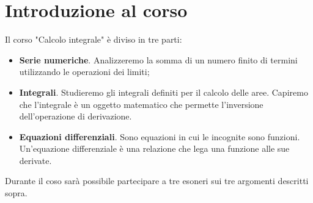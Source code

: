 \chapter*{Introduzione al corso}

Il corso "Calcolo integrale" è diviso in tre parti:
\begin{itemize}
    \item \textbf{Serie numeriche}. Analizzeremo la somma di un numero finito di termini utilizzando le operazioni dei limiti;
    \item \textbf{Integrali}. Studieremo gli integrali definiti per il calcolo delle aree. Capiremo che l'integrale è un oggetto matematico che permette l'inversione dell'operazione di derivazione.
    \item \textbf{Equazioni differenziali}. Sono equazioni in cui le incognite sono funzioni. Un'equazione differenziale è una relazione che lega una funzione alle sue derivate.
\end{itemize}

Durante il coso sarà possibile partecipare a tre esoneri sui tre argomenti descritti sopra.